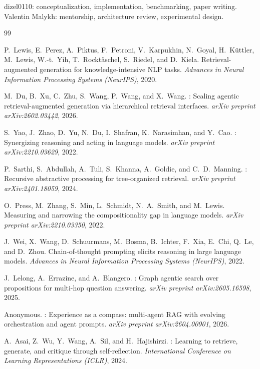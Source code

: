 \documentclass{zapiski}
\begin{document}
dizel0110: conceptualization, implementation, benchmarking, paper writing. Valentin Malykh: mentorship, architecture review, experimental design.

\begin{thebibliography}{99}

P.~Lewis, E.~Perez, A.~Piktus, F.~Petroni, V.~Karpukhin, N.~Goyal, H.~K\"{u}ttler, M.~Lewis, W.-t.~Yih, T.~Rockt\"{a}schel, S.~Riedel, and D.~Kiela.
\newblock Retrieval-augmented generation for knowledge-intensive {NLP} tasks.
\newblock \emph{Advances in Neural Information Processing Systems (NeurIPS)}, 2020.

M.~Du, B.~Xu, C.~Zhu, S.~Wang, P.~Wang, and X.~Wang.
: Scaling agentic retrieval-augmented generation via hierarchical retrieval interfaces.
\newblock \emph{arXiv preprint arXiv:2602.03442}, 2026.

S.~Yao, J.~Zhao, D.~Yu, N.~Du, I.~Shafran, K.~Narasimhan, and Y.~Cao.
: Synergizing reasoning and acting in language models.
\newblock \emph{arXiv preprint arXiv:2210.03629}, 2022.

P.~Sarthi, S.~Abdullah, A.~Tuli, S.~Khanna, A.~Goldie, and C.~D.~Manning.
: Recursive abstractive processing for tree-organized retrieval.
\newblock \emph{arXiv preprint arXiv:2401.18059}, 2024.

O.~Press, M.~Zhang, S.~Min, L.~Schmidt, N.~A.~Smith, and M.~Lewis.
\newblock Measuring and narrowing the compositionality gap in language models.
\newblock \emph{arXiv preprint arXiv:2210.03350}, 2022.

J.~Wei, X.~Wang, D.~Schuurmans, M.~Bosma, B.~Ichter, F.~Xia, E.~Chi, Q.~Le, and D.~Zhou.
\newblock Chain-of-thought prompting elicits reasoning in large language models.
\newblock \emph{Advances in Neural Information Processing Systems (NeurIPS)}, 2022.

J.~Lelong, A.~Errazine, and A.~Blangero.
: Graph agentic search over propositions for multi-hop question answering.
\newblock \emph{arXiv preprint arXiv:2605.16598}, 2025.

Anonymous.
: Experience as a compass: multi-agent {RAG} with evolving orchestration and agent prompts.
\newblock \emph{arXiv preprint arXiv:2604.00901}, 2026.

A.~Asai, Z.~Wu, Y.~Wang, A.~Sil, and H.~Hajishirzi.
: Learning to retrieve, generate, and critique through self-reflection.
\newblock \emph{International Conference on Learning Representations (ICLR)}, 2024.


\end{thebibliography}
\end{document}
